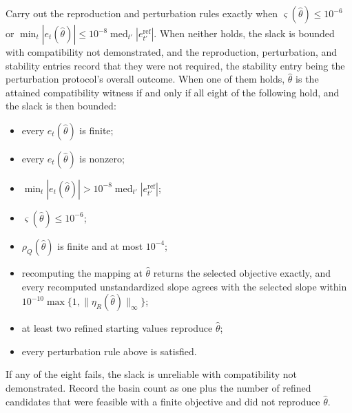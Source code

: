 \documentclass[11pt]{article}
\begin{document}
Carry out the reproduction and perturbation rules exactly when \(\varsigma(\widehat\theta)\le10^{-6}\)
or \(\min_t|e_t(\widehat\theta)|\le10^{-8}\operatorname{med}_{t'}|e_{t'}^{\mathrm{ref}}|\). When
neither holds, the slack is bounded with compatibility not demonstrated, and the reproduction,
perturbation, and stability entries record that they were not required, the stability entry being the
perturbation protocol's overall outcome. When one of them holds,
\(\widehat\theta\) is the attained compatibility witness if and only if all eight of the
following hold, and the slack is then bounded:
\begin{itemize}
\item every \(e_t(\widehat\theta)\) is finite;
\item every \(e_t(\widehat\theta)\) is nonzero;
\item \(\min_t|e_t(\widehat\theta)|>10^{-8}\operatorname{med}_{t'}|e_{t'}^{\mathrm{ref}}|\);
\item \(\varsigma(\widehat\theta)\le10^{-6}\);
\item \(\rho_Q(\widehat\theta)\) is finite and at most \(10^{-4}\);
\item recomputing the mapping at \(\widehat\theta\) returns the selected objective exactly, and every
 recomputed unstandardized slope agrees with the selected slope within
 \(10^{-10}\max\{1,\|\eta_R(\widehat\theta)\|_\infty\}\);
\item at least two refined starting values reproduce \(\widehat\theta\);
\item every perturbation rule above is satisfied.
\end{itemize}
If any of the eight fails, the slack is unreliable with compatibility not demonstrated. Record the
basin count as one plus the number of refined candidates that were feasible with a finite objective
and did not reproduce \(\widehat\theta\).
\end{document}
